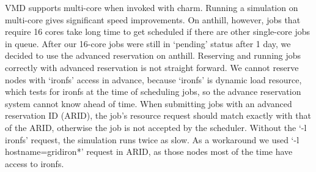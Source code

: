 VMD supports multi-core when invoked with charm.
Running a simulation on multi-core gives significant speed improvements.
On anthill, however, jobs that require 16 cores take long time to get scheduled if there are other single-core jobs in queue.
After our 16-core jobs were still in `pending' status after 1 day, we decided to use the advanced reservation on anthill\cite{anthill-ar}.
Reserving and running jobs correctly with advanced reservation is not straight forward.
We cannot reserve nodes with `ironfs' access in advance, because `ironfs' is dynamic load resource, which tests for ironfs at the time of scheduling jobs, so the advance reservation system cannot know ahead of time.
When submitting jobs with an advanced reservation ID (ARID), the job's resource request should match exactly with that of the ARID, otherwise the job is not accepted by the scheduler.
Without the `-l ironfs' request, the simulation runs twice as slow.
As a workaround we used `-l hostname=gridiron*' request in ARID, as those nodes most of the time have access to ironfs\cite{tim:email}.


